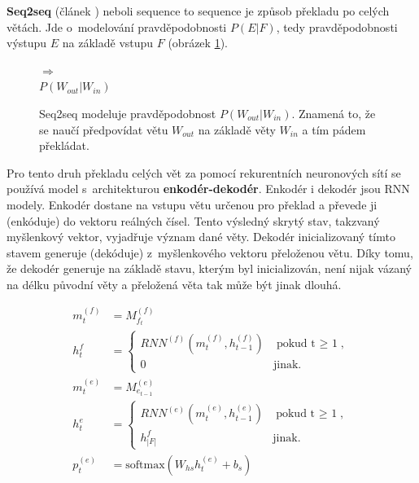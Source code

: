 \textbf{Seq2seq} (článek \cite{seq2seq}) neboli sequence to sequence je způsob překladu po celých větách. Jde o~modelování pravděpodobnosti $P(E|F)$, tedy pravděpodobnosti výstupu $E$ na základě vstupu $F$ (obrázek \ref{figure:seqProbability}).

\begin{figure}[H]
    \begin{center}
        \setlength{\fboxsep}{8pt}
        $\Longrightarrow$
        \\ \vspace{5mm}
        $P(W_{out}|W_{in})$
    \end{center}
	\caption{Seq2seq modeluje pravděpodobnost $P(W_{out}|W_{in})$. Znamená to, že se naučí předpovídat větu $W_{out}$ na základě věty $W_{in}$ a tím pádem překládat.}
	\label{figure:seqProbability}
\end{figure}

Pro tento druh překladu celých vět za pomocí rekurentních neuronových sítí se používá model s~architekturou \textbf{enkodér-dekodér}. Enkodér i dekodér jsou RNN modely. Enkodér dostane na vstupu větu určenou pro překlad a převede ji (enkóduje) do vektoru reálných čísel. Tento výsledný skrytý stav, takzvaný myšlenkový vektor, vyjadřuje význam dané věty. Dekodér inicializovaný tímto stavem generuje (dekóduje) z~myšlenkového vektoru přeloženou větu. Díky tomu, že dekodér generuje na základě stavu, kterým byl inicializován, není nijak vázaný na délku původní věty a přeložená věta tak může být jinak dlouhá.


\begin{align}
    m^{(f)}_{t}&=M^{(f)}_{f_t}\label{figure:encoderEmb} \\
    h^{f}_{t}&=\begin{cases}
                    RNN^{(f)}(m^{(f)}_{t},h^{(f)}_{t-1}) & \mbox{pokud t $\geq$ 1},\label{figure:encoderState} \\
                    0 & \mbox{jinak}.
                \end{cases}\\
    m^{(e)}_{t}&=M^{(e)}_{e_{t-1}}\label{figure:decoderEmb} \\
    h^{e}_{t}&=\begin{cases}
                    RNN^{(e)}(m^{(e)}_{t},h^{(e)}_{t-1}) & \mbox{pokud t $\geq$ 1},\\
                    h^{f}_{|F|} & \mbox{jinak}.
                \end{cases}\label{figure:decoderState} \\
    p^{(e)}_{t}&=\mbox{softmax}(W_{hs}h^{(e)}_{t} + b_{s}) \label{figure:resultSoftmax}
\end{align}


